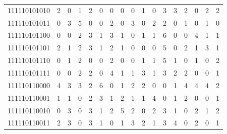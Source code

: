 \documentclass[10pt,a4paper]{article}
\begin{document}
\begin{longtable}{ |c|c|c|c|c|c|c|c|c|c|c|c|c|c|c|c|c| }
    111110101010              & 2                            & 0                                & 1                            & 2                              & 0   & 0   & 0   & 0   & 1   & 0   & 3   & 3   & 2   & 0   & 2   & 2   \\
    111110101011              & 0                            & 3                                & 5                            & 0                              & 0   & 2   & 0   & 3   & 0   & 2   & 2   & 0   & 1   & 0   & 1   & 0   \\
    111110101100              & 0                            & 0                                & 2                            & 3                              & 1   & 3   & 1   & 0   & 1   & 1   & 6   & 0   & 0   & 4   & 1   & 1   \\
    111110101101              & 2                            & 1                                & 2                            & 3                              & 1   & 2   & 1   & 0   & 0   & 0   & 5   & 0   & 2   & 1   & 3   & 1   \\
    111110101110              & 0                            & 1                                & 2                            & 0                              & 0   & 2   & 0   & 0   & 1   & 1   & 5   & 1   & 0   & 1   & 0   & 2   \\
    111110101111              & 0                            & 0                                & 2                            & 2                              & 0   & 4   & 1   & 1   & 3   & 1   & 3   & 2   & 2   & 0   & 0   & 1   \\
    111110110000              & 4                            & 3                                & 3                            & 2                              & 6   & 0   & 1   & 2   & 2   & 0   & 0   & 1   & 4   & 4   & 4   & 2   \\
    111110110001              & 1                            & 1                                & 0                            & 2                              & 3   & 1   & 2   & 1   & 1   & 4   & 0   & 1   & 2   & 0   & 0   & 1   \\
    111110110010              & 0                            & 3                                & 0                            & 3                              & 1   & 2   & 5   & 2   & 0   & 2   & 3   & 1   & 0   & 2   & 1   & 2   \\
    111110110011              & 2                            & 3                                & 0                            & 3                              & 1   & 0   & 1   & 3   & 2   & 1   & 3   & 4   & 0   & 2   & 0   & 1   \\

\end{longtable}
\end{document}
